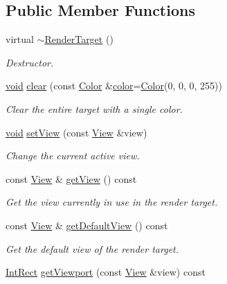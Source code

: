 \subsection*{Public Member Functions}
\begin{DoxyCompactItemize}
\item 
virtual \hyperlink{classsf_1_1_render_target_a9abd1654a99fba46f6887b9c625b9b06}{$\sim$\-Render\-Target} ()
\begin{DoxyCompactList}\small\item\em Destructor. \end{DoxyCompactList}\item 
\hyperlink{glutf90_8h_ac778d6f63f1aaf8ebda0ce6ac821b56e}{void} \hyperlink{classsf_1_1_render_target_a6bb6f0ba348f2b1e2f46114aeaf60f26}{clear} (const \hyperlink{classsf_1_1_color}{Color} \&\hyperlink{gl3_8h_a3ea846f998d64f079b86052b6c4193a8}{color}=\hyperlink{classsf_1_1_color}{Color}(0, 0, 0, 255))
\begin{DoxyCompactList}\small\item\em Clear the entire target with a single color. \end{DoxyCompactList}\item 
\hyperlink{glutf90_8h_ac778d6f63f1aaf8ebda0ce6ac821b56e}{void} \hyperlink{classsf_1_1_render_target_a063db6dd0a14913504af30e50cb6d946}{set\-View} (const \hyperlink{classsf_1_1_view}{View} \&view)
\begin{DoxyCompactList}\small\item\em Change the current active view. \end{DoxyCompactList}\item 
const \hyperlink{classsf_1_1_view}{View} \& \hyperlink{classsf_1_1_render_target_a98f721cc6dc11478922427fedfb2288b}{get\-View} () const 
\begin{DoxyCompactList}\small\item\em Get the view currently in use in the render target. \end{DoxyCompactList}\item 
const \hyperlink{classsf_1_1_view}{View} \& \hyperlink{classsf_1_1_render_target_a718b1aa6296bf855171699cc18251ced}{get\-Default\-View} () const 
\begin{DoxyCompactList}\small\item\em Get the default view of the render target. \end{DoxyCompactList}\item 
\hyperlink{namespacesf_aae67411782674934f78d55fa3af18403}{Int\-Rect} \hyperlink{classsf_1_1_render_target_aae035b0d45f87a0da2a28a0de6ba1086}{get\-Viewport} (const \hyperlink{classsf_1_1_view}{View} \&view) const 

\end{DoxyCompactItemize}
